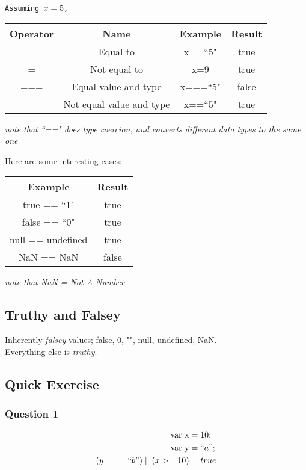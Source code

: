 \documentclass[11pt, a4paper]{article}   	%
\begin{document}
\begin{center}
\texttt{Assuming $x=5$,}

\begin{tabular}{|c|c|c|c|}
	\hline
	Operator & Name & Example & Result\\ \hline
	== & Equal to & x==``5" & true\\ \hline
	$\!$= & Not equal to & x$\!$=9 & true\\ \hline
	=== & Equal value and type & x===``5" & false\\ \hline
	$\!==$ & Not equal value and type & x$\!$==``5" & true\\ \hline
\end{tabular}

\emph{note that ``==" does type coercion, and converts different data types to the same one }

Here are some interesting cases:

\begin{tabular}{|c|c|}
	\hline
	Example & Result\\ \hline
	true == ``1" & true\\ \hline
	false == ``0" & true\\ \hline
	null == undefined & true\\ \hline
	NaN == NaN & false\\ \hline
\end{tabular}

\emph{note that NaN = Not A Number}
\end{center}

\subsection{Truthy and Falsey}
Inherently \emph{falsey} values; false, 0, "", null, undefined, NaN. \\Everything else is \emph{truthy}.

\subsection{Quick Exercise}
\subsubsection{Question 1}
	\begin{align*}
		\text{var x} &= 10;\\
		\text{var y} &= ``a";\\
		(y === ``b") \mid\mid (x>=10) &= true
	\end{align*}
	
\end{document}
